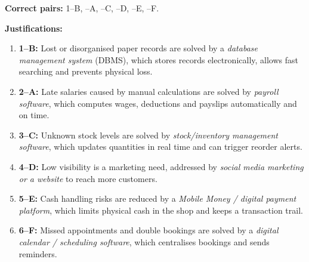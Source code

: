\documentclass[11pt]{article}
\begin{document}
\begin{corrige}
\textbf{Correct pairs:} 1--B, --A, --C, --D, --E, --F.

\textbf{Justifications:}
\begin{enumerate}
\item \textbf{1--B:} Lost or disorganised paper records are solved by a \emph{database management system} (DBMS), which stores records electronically, allows fast searching and prevents physical loss.
\item \textbf{2--A:} Late salaries caused by manual calculations are solved by \emph{payroll software}, which computes wages, deductions and payslips automatically and on time.
\item \textbf{3--C:} Unknown stock levels are solved by \emph{stock/inventory management software}, which updates quantities in real time and can trigger reorder alerts.
\item \textbf{4--D:} Low visibility is a marketing need, addressed by \emph{social media marketing or a website} to reach more customers.
\item \textbf{5--E:} Cash handling risks are reduced by a \emph{Mobile Money / digital payment platform}, which limits physical cash in the shop and keeps a transaction trail.
\item \textbf{6--F:} Missed appointments and double bookings are solved by a \emph{digital calendar / scheduling software}, which centralises bookings and sends reminders.
\end{enumerate}
\end{corrige}
\end{document}

